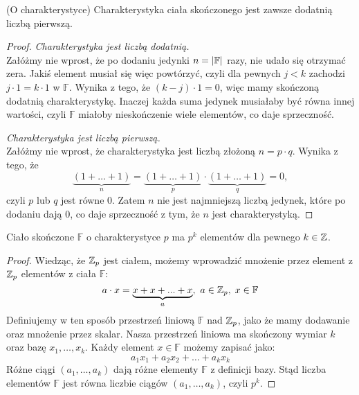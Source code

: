 \begin{theorem}(O charakterystyce)
Charakterystyka ciała skończonego jest zawsze dodatnią liczbą pierwszą.
\end{theorem}
\begin{proof}
    \textit{Charakterystyka jest liczbą dodatnią.} \\
    Załóżmy nie wprost, że po dodaniu jedynki \( n = \left\lvert\mathbb{F}\right\rvert \) razy, nie udało się otrzymać zera. Jakiś element musiał się więc powtórzyć, czyli dla pewnych \( j < k \) zachodzi \( j \cdot 1 = k \cdot 1 \) w \( \mathbb{F} \).
    Wynika z tego, że \( (k - j) \cdot 1 = 0 \), więc mamy skończoną dodatnią charakterystykę. Inaczej każda suma jedynek musiałaby być równa innej wartości, czyli \( \mathbb{F} \) miałoby nieskończenie wiele elementów, co daje sprzeczność.

    \textit{Charakterystyka jest liczbą pierwszą.} \\
    Załóżmy nie wprost, że charakterystyka jest liczbą złożoną \( n = p \cdot q \). Wynika z tego, że
    \[
        \underbrace{(1 + \dots + 1)}_n = \underbrace{(1 + \dots + 1)}_p \cdot \underbrace{(1 + \dots + 1)}_q = 0,
    \]
    czyli \( p \) lub \( q \) jest równe 0. Zatem \( n \) nie jest najmniejszą liczbą jedynek, które po dodaniu dają 0, co daje sprzeczność z tym, że \( n \) jest charakterystyką.
\end{proof}

\newpage
\begin{theorem}
Ciało skończone \( \mathbb{F} \)  o charakterystyce \( p \) ma \( p^k \) elementów dla pewnego \( k \in \mathbb{Z} \).
\end{theorem}
 \begin{proof}
    Wiedząc, że \( \mathbb{Z}_p \) jest ciałem, możemy wprowadzić mnożenie przez element z \( \mathbb{Z}_p \) elementów z ciała \( \mathbb{F} \):
    \[
        a \cdot x = \underbrace{x + x + ... + x}_a, \ a \in \mathbb{Z}_p,\; x \in \mathbb{F}
    \]
    Definiujemy w ten sposób przestrzeń liniową \( \mathbb{F} \) nad \( \mathbb{Z}_p \), jako że mamy dodawanie oraz mnożenie przez skalar. Nasza przestrzeń liniowa ma skończony wymiar \( k \) oraz bazę \( x_1, \dots, x_k \).
    Każdy element \( x \in \mathbb{F} \) możemy zapisać jako:
    \[
        a_1x_1 + a_2x_2 + \dots + a_kx_k
    \]
    Różne ciągi \( (a_1, \dots, a_k) \) dają różne elementy \( \mathbb{F} \) z definicji bazy. Stąd liczba elementów \( \mathbb{F} \) jest równa liczbie ciągów \( (a_1, \dots, a_k) \), czyli \( p^k \).
\end{proof}